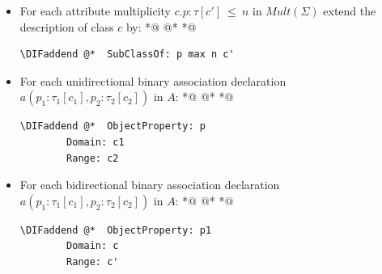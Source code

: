 \documentclass[10pt,fleqn,final]{scrreprt}
\newenvironment{definitions}[0]{\medskip }{}
\providecommand{\DIFaddbegin}{} %
\providecommand{\DIFaddend}{} %
\providecommand{\DIFdelbegin}{} %
\providecommand{\DIFdelend}{} %
\begin{document}
\begin{definitions}
\begin{itemize}
\item For each attribute multiplicity $ c.p:\tau[c'] \ \mathsf{\leq}\ n$  in $\mathit{Mult}(\Sigma)$ extend the description of class $c$ by:
 *@ \DIFdelbegin %
\DIFdelend @*   *@ \DIFaddbegin \begin{lstlisting}[language=owl2Manchester]
	\DIFaddend @*  SubClassOf: p max n c'
\end{lstlisting}

\item For each unidirectional binary association declaration $a(p_1:\tau_1[c_1],p_2:\tau_2[c_2])$ in $A$:
 *@ \DIFdelbegin %
\DIFdelend @*   *@ \DIFaddbegin \begin{lstlisting}[language=owl2Manchester]
	\DIFaddend @*  ObjectProperty: p
		Domain: c1
		Range: c2
\end{lstlisting}
\item For each bidirectional binary association declaration $a(p_1:\tau_1[c_1],p_2:\tau_2[c_2])$ in $A$:
 *@ \DIFdelbegin %
\DIFdelend @*   *@ \DIFaddbegin \begin{lstlisting}[language=owl2Manchester]
	\DIFaddend @*  ObjectProperty: p1
		Domain: c
		Range: c'


\end{lstlisting}
\end{itemize}
\end{definitions}
\end{document}
